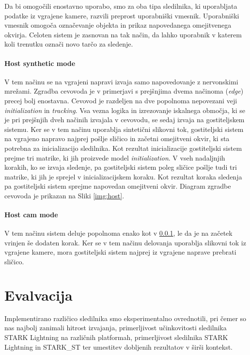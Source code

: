 \documentclass[a4paper,12pt,openright]{book}
\begin{document}
Da bi omogočili enostavno uporabo, smo za oba tipa sledilnika, ki uporabljata podatke iz vgrajene kamere, razvili preprost uporabniški vmesnik. Uporabniški vmesnik omogoča označevanje objekta in prikaz napovedanega omejitvenega okvirja. Celoten sistem je zasnovan na tak način, da lahko uporabnik v katerem koli trenutku označi novo tarčo za sledenje.

\subsubsection{Host synthetic mode}
\label{sec:host_synth}
V tem načinu se na vgrajeni napravi izvaja samo napovedovanje z nervonskimi mrežami. Zgradba cevovoda je v primerjavi s prejšnjima dvema načinoma (\emph{edge}) precej bolj enostavna. Cevovod je razdeljen na dve popolnoma nepovezani veji \emph{initialization} in \emph{tracking}. Vsa vezna logika in izrezovanje iskalnega območja, ki se je pri prejšnjih dveh načinih izvajala v cevovodu, se sedaj izvaja na gostiteljskem sistemu. Ker se v tem načinu uporablja sintetični slikovni tok, gostiteljski sistem na vgrajeno napravo najprej pošlje sličico in začetni omejitveni okvir, ki sta potrebna za inicializacijo sledilnika. Kot rezultat inicializacije gostiteljski sistem prejme tri matrike, ki jih proizvede model \emph{initialization}. V vseh nadaljnjih korakih, ko se izvaja sledenje, pa gostiteljski sistem poleg sličice pošlje tudi tri matrike, ki jih je sprejel v inicializacijskem koraku. Kot rezultat koraka sledenja pa gostiteljski sistem sprejme napovedan omejitveni okvir. Diagram zgradbe cevovoda je prikazan na Sliki \ref{img:host}.

\subsubsection{Host cam mode}
V tem načinu sistem deluje popolnoma enako kot v \ref{sec:host_synth}, le da je na začetek vrinjen še dodaten korak. Ker se v tem načinu delovanja uporablja slikovni tok iz vgrajene kamere, mora gostiteljski sistem najprej iz vgrajene naprave prebrati sličico.


\chapter{Evalvacija}
\label{ch:4}
Implementirano različico sledilnika smo eksperimentalno ovrednotili, pri če\-mer so nas najbolj zanimali hitrost izvajanja, primerljivost učinkovitosti sledilnika STARK Lightning na različnih platformah, primerljivost sledilnika STARK Lightning in STARK\_ST ter umestitev dobljenih rezultatov v širši kontekst.
\end{document}
